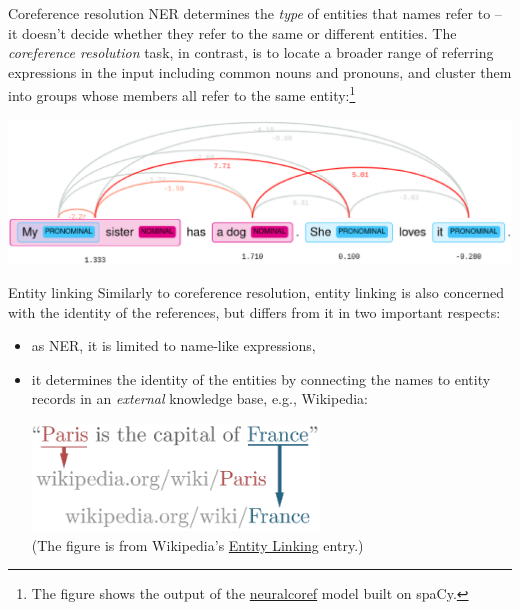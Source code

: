 \documentclass[style=upen, size=14pt]{powerdot}
\newcommand{\gold}{\color{arany}}
\begin{document}
\begin{slide}[toc=Coreference resolution]{Coreference resolution}
  NER determines the \emph{type} of entities that names refer to -- it doesn't
  decide whether they refer to the same or different entities. The \emph{\gold
    coreference resolution} task, in contrast, is to locate a broader range of
  referring expressions in the input including common nouns and pronouns, and
  cluster them into groups whose members all refer to the same
  entity:\footnote{The figure shows the output of the
    \href{https://spacy.io/universe/project/neuralcoref}{neuralcoref} model
    built on spaCy.}

  \includegraphics[width=1.\textwidth]{coref.eps}
\end{slide}

\begin{slide}[toc=Entity linking]{Entity linking}
  Similarly to coreference resolution, entity linking is also concerned with the
  identity of the references, but differs from it in two important respects:
  \begin{itemize}
  \item as \textsc{NER}, it is limited to name-like expressions,
  \item it determines the identity of the entities by connecting the
    names to entity records in an \emph{external} knowledge base, e.g.,
    Wikipedia:
  \begin{center}
    \includegraphics[width=0.6\textwidth]{Entity_Linking.eps}\\
    \footnotesize{(The figure is from Wikipedia's \href{https://en.wikipedia.org/wiki/Entity_linking}{Entity Linking} entry.)}
\end{center}
\end{itemize}
\end{slide}
\end{document}
